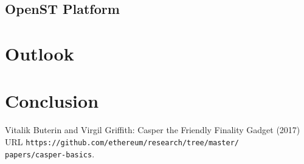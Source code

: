 \documentclass[12pt,a4paper,draft]{article}
\begin{document}
\subsection{OpenST Platform}

\section{Outlook}

\section{Conclusion}

\begin{thebibliography}{9}

  Vitalik Buterin and Virgil Griffith:
  Casper the Friendly Finality Gadget (2017)\\
  URL \texttt{https://github.com/ethereum/research/tree/master/\\papers/casper-basics}.

\end{thebibliography}
\end{document}
